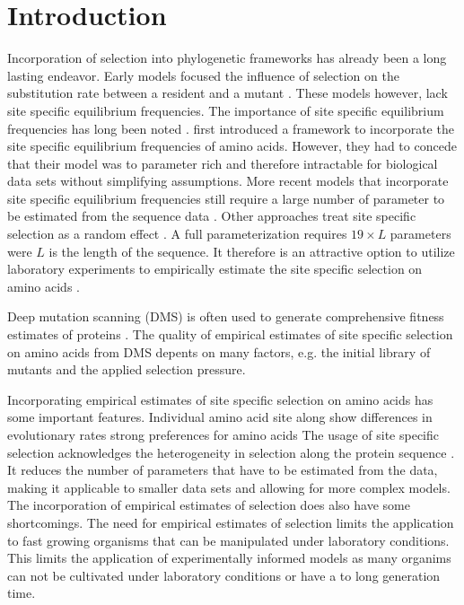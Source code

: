 \documentclass[12pt]{article}
\begin{document}
\section*{Introduction}

Incorporation of selection into phylogenetic frameworks has already been a long lasting endeavor.
Early models focused the influence of selection on the substitution rate between a resident and a mutant \citep{GoldmanAndYang1994, MuseAndGaut1994, thorne1996}.
These models however, lack site specific equilibrium frequencies.
The importance of site specific equilibrium frequencies has long been noted \citep{felsenstein1981, gojobori1983}.
\citet{HalpernAndBruno1998} first introduced a framework to incorporate the site specific equilibrium frequencies of amino acids.
However, they had to concede that their model was to parameter rich and therefore intractable for biological data sets without simplifying assumptions.
More recent models that incorporate site specific equilibrium frequencies still require a large number of parameter to be estimated from the sequence data \citep{LartillotAndPhilippe2004,le2008,wang2008,holder2008,wu2013,tamuri2014}.
Other approaches treat site specific selection as a random effect \citep{rodrigue2010,rodrigue2013,rodrigue2014}.
A full parameterization requires $19\times L$ parameters were $L$ is the length of the sequence.
It therefore is an attractive option to utilize laboratory experiments to empirically estimate the site specific selection on amino acids \citep{bloom2014, thyagarajan2014, bloom2017}.

Deep mutation scanning (DMS) is often used to generate comprehensive fitness estimates of proteins \citep{Fowler2014}.
The quality of empirical estimates of site specific selection on amino acids from DMS depents on many factors, e.g. the initial library of mutants and the applied selection pressure.

Incorporating empirical estimates of site specific selection on amino acids has some important features.
Individual amino acid site along show differences in evolutionary rates strong preferences for amino acids \citep{HalpernAndBruno1998, ashenberg2013, echave2016}
The usage of site specific selection acknowledges the heterogeneity in selection along the protein sequence \citep{hilton2017}.
It reduces the number of parameters that have to be estimated from the data, making it applicable to smaller data sets and allowing for more complex models.
The incorporation of empirical estimates of selection does also have some shortcomings.
The need for empirical estimates of selection limits the application to fast growing organisms that can be manipulated under laboratory conditions.
This limits the application of experimentally informed models as many organims can not be cultivated under laboratory conditions or have a to long generation time.
\end{document}
